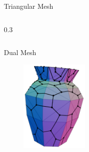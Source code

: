 \documentclass{beamer}
\begin{document}
\begin{frame}{Triangular Mesh}
\begin{columns}
\begin{column}{0.3\pagewidth}
\begin{figure}
        \end{figure}
    \end{column}
    \end{columns}
\end{frame}

\begin{frame}{Dual Mesh}
    \begin{figure}
        \centering
        \includegraphics[width=0.3\textwidth]{../figures/vase_dual.png}
    \end{figure}
\end{frame}
\end{document}
